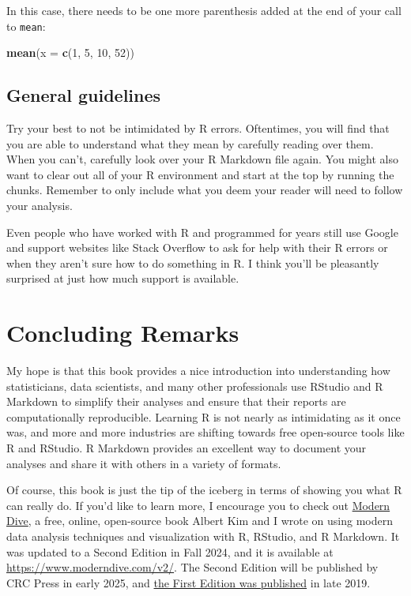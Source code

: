 \documentclass[]{tufte-book}
\newenvironment{Shaded}{\begin{snugshade}}{\end{snugshade}}
\newcommand{\AttributeTok}[1]{\textcolor[rgb]{0.13,0.29,0.53}{#1}}
\newcommand{\DecValTok}[1]{\textcolor[rgb]{0.00,0.00,0.81}{#1}}
\newcommand{\FunctionTok}[1]{\textcolor[rgb]{0.13,0.29,0.53}{\textbf{#1}}}
\newcommand{\NormalTok}[1]{#1}
\begin{document}
In this case, there needs to be one more parenthesis added at the end of your call to \texttt{mean}:

\begin{Shaded}
\begin{Highlighting}[]
\FunctionTok{mean}\NormalTok{(}\AttributeTok{x =} \FunctionTok{c}\NormalTok{(}\DecValTok{1}\NormalTok{, }\DecValTok{5}\NormalTok{, }\DecValTok{10}\NormalTok{, }\DecValTok{52}\NormalTok{))}
\end{Highlighting}
\end{Shaded}

\section{General guidelines}\label{general-guidelines}

Try your best to not be intimidated by R errors. Oftentimes, you will find that you are able to understand what they mean by carefully reading over them. When you can't, carefully look over your R Markdown file again. You might also want to clear out all of your R environment and start at the top by running the chunks. Remember to only include what you deem your reader will need to follow your analysis.

Even people who have worked with R and programmed for years still use Google and support websites like Stack Overflow to ask for help with their R errors or when they aren't sure how to do something in R. I think you'll be pleasantly surprised at just how much support is available.

\chapter{Concluding Remarks}\label{conclusion}

My hope is that this book provides a nice introduction into understanding how statisticians, data scientists, and many other professionals use RStudio and R Markdown to simplify their analyses and ensure that their reports are computationally reproducible. Learning R is not nearly as intimidating as it once was, and more and more industries are shifting towards free open-source tools like R and RStudio. R Markdown provides an excellent way to document your analyses and share it with others in a variety of formats.

Of course, this book is just the tip of the iceberg in terms of showing you what R can really do. If you'd like to learn more, I encourage you to check out \href{http://www.moderndive.com/}{Modern Dive}, a free, online, open-source book Albert Kim and I wrote on using modern data analysis techniques and visualization with R, RStudio, and R Markdown. It was updated to a Second Edition in Fall 2024, and it is available at \url{https://www.moderndive.com/v2/}. The Second Edition will be published by CRC Press in early 2025, and \href{https://www.routledge.com/Statistical-Inference-via-Data-Science-A-ModernDive-into-R-and-the-Tidyverse/Ismay-Kim/p/book/9780367409821?srsltid=AfmBOoqLasBhcQVciOoGIeKfZ-kdfG2KwkcXISwn-D8_u8Zku7Z8FqKd}{the First Edition was published} in late 2019.
\end{document}
